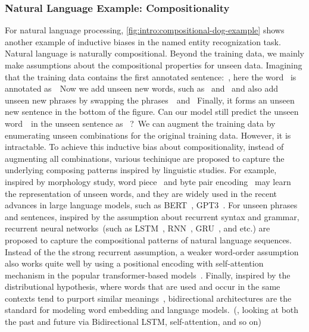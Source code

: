 \subsubsection{Natural Language Example: Compositionality}
\label{sssec:intro:nlp-example}

For natural language processing,
\autoref{fig:intro:compositional-dog-example} shows another example of
inductive biases in the named entity recognization task. Natural
language is naturally compositional. Beyond the training data, we
mainly make assumptions about the compositional properties for unseen
data. Imagining that the training data contains the first annotated
sentence:~, here the word~ is annotated as~~Now
we add unseen new words, such as~ and~
and also add unseen new phrases by swapping the phrases~~and~ Finally, it forms an unseen new
sentence in the bottom of the figure. Can our model still predict the
unseen word~~in the unseen sentence as
~?~We can augment the training data by enumerating
unseen combinations for the original training data. However, it is
intractable. To achieve this inductive bias about compositionality,
instead of augmenting all combinations, various techinique are
proposed to capture the underlying composing patterns inspired by
linguistic studies. For example, inspired by morphology study, word
piece~\citep{schuster2012japanese} and byte pair
encoding~\citep[BPE,][]{sennrich2016neural} may learn the
representation of unseen words, and they are widely used in the recent
advances in large language models, such as
BERT~\citep{devlin2019bert}, GPT3~\citep{brown2020language}. For
unseen phrases and sentences, inspired by the assumption about
recurrent syntax and grammar, recurrent neural networks~(such as
LSTM~\citep{hochreiter97lstm}, RNN~\citep{mesnil13rnn},
GRU~\citep{chung14gru}, and etc.)  are proposed to capture the
compositional patterns of natural language sequences. Instead of the
the strong recurrent assumption, a weaker word-order assumption also
works quite well by using a positional encoding with self-attention
mechanism in the popular transformer-based
models~\citep{NIPS2017_7181}. Finally, inspired by the distributional
hypothesis, where words that are used and occur in the same contexts
tend to purport similar meanings~\cite{harris1954distributional},
bidirectional architectures are the standard for modeling word
embedding and language models.~(\eg, looking at both the past and
future via Bidirectional LSTM, self-attention, and so on)

